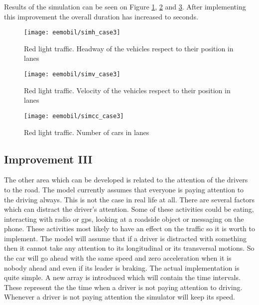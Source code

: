 		Results of the simulation can be seen on Figure \ref{fig:red_light_situationh_impr2}, \ref{fig:red_light_situationv_impr2} and \ref{fig:red_light_situationcc_impr2}. After implementing this improvement the overall duration has increased to seconds.
		\begin{figure}
			\centering
			\texttt{[image: eemobil/simh\_case3]}
			\caption{Red light traffic. Headway of the vehicles respect to their position in lanes}
			\label{fig:red_light_situationh_impr2}
		\end{figure}
		\begin{figure}
			\centering
			\texttt{[image: eemobil/simv\_case3]}
			\caption{Red light traffic. Velocity of the vehicles respect to their position in lanes}
			\label{fig:red_light_situationv_impr2}
		\end{figure}
		\begin{figure}
			\centering
			\texttt{[image: eemobil/simcc\_case3]}
			\caption{Red light traffic. Number of cars in lanes }
			\label{fig:red_light_situationcc_impr2}
		\end{figure}
		\subsection{Improvement III}
		The other area which can be developed is related to the attention of the drivers to the road. The model currently assumes that everyone is paying attention to the driving always. This is not the case in real life at all. There are several factors which can distract the driver's attention. Some of these activities could be eating, interacting with radio or gps, looking at a roadside object or messaging on the phone. These activities most likely to have an effect on the traffic so it is worth to implement. The model will assume that if a driver is distracted with something then it cannot take any attention to its longitudinal or its transversal motions. So the car will go ahead with the same speed and zero acceleration when it is nobody ahead and even if its leader is braking. The actual implementation is quite simple. A new array is introduced which will contain the time intervals. These represent the the time when a driver is not paying attention to driving. Whenever a driver is not paying attention the simulator will keep its speed.


